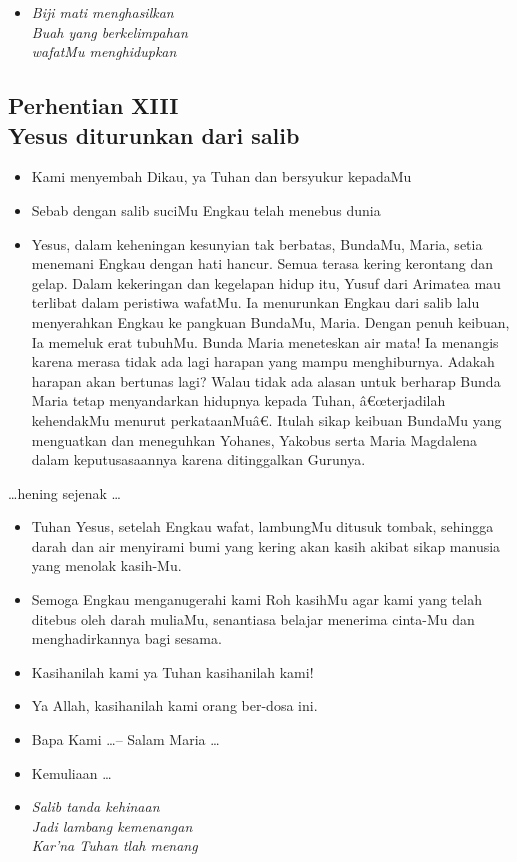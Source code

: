 \documentclass[a5paper,headsepline,titlepage,10pt,nnormalheadings,DIVcalc]{scrbook}
\newcommand{\BU}[1]{\begin{itemize} \item[U:] #1 \end{itemize}}
\newcommand{\BP}[1]{\begin{itemize} \item[P:] #1 \end{itemize}}
\newcommand{\BL}[1]{\begin{itemize} \item[L:] #1 \end{itemize}}
\begin{document}
\begin{itemize}
\item[13.] \it{Biji mati menghasilkan\\
Buah yang berkelimpahan\\
wafatMu menghidupkan}
\end{itemize}



\subsection*{Perhentian XIII
\\Yesus diturunkan dari salib}

\BP{Kami menyembah Dikau, ya Tuhan dan bersyukur kepadaMu}
\BU{Sebab dengan salib suciMu Engkau telah menebus dunia}
\BL{Yesus, dalam keheningan kesunyian tak berbatas, BundaMu, Maria, setia menemani Engkau dengan hati hancur. Semua terasa kering kerontang dan gelap. Dalam kekeringan dan kegelapan hidup itu, Yusuf dari Arimatea mau terlibat dalam peristiwa wafatMu. Ia menurunkan Engkau dari salib lalu menyerahkan Engkau ke pangkuan BundaMu, Maria. Dengan penuh keibuan, Ia memeluk erat tubuhMu. Bunda Maria meneteskan air mata! Ia menangis karena merasa tidak ada lagi harapan yang mampu menghiburnya. Adakah harapan akan bertunas lagi? Walau tidak ada alasan untuk berharap Bunda Maria tetap menyandarkan hidupnya kepada Tuhan, â€œterjadilah kehendakMu menurut perkataanMuâ€. Itulah sikap keibuan BundaMu yang menguatkan dan meneguhkan Yohanes, Yakobus serta Maria Magdalena dalam keputusasaannya karena ditinggalkan Gurunya.}

\begin{center}\dots hening sejenak \dots\end{center}

\BP{Tuhan Yesus, setelah Engkau wafat, lambungMu ditusuk tombak, sehingga darah dan air menyirami bumi yang kering akan kasih akibat sikap manusia yang menolak kasih-Mu.}
\BU{Semoga Engkau menganugerahi kami Roh kasihMu agar kami yang telah ditebus oleh darah muliaMu, senantiasa belajar menerima cinta-Mu dan menghadirkannya bagi sesama.}
\BP{Kasihanilah kami ya Tuhan kasihanilah kami!}
\BU{Ya Allah, kasihanilah kami orang ber-dosa ini.}
\BP{Bapa Kami \dots -- Salam Maria \dots}
\BP{Kemuliaan \dots}

\begin{itemize}
\item[14.] \it{Salib tanda kehinaan\\
Jadi lambang kemenangan\\
Kar'na Tuhan tlah menang}
\end{itemize}
\end{document}
